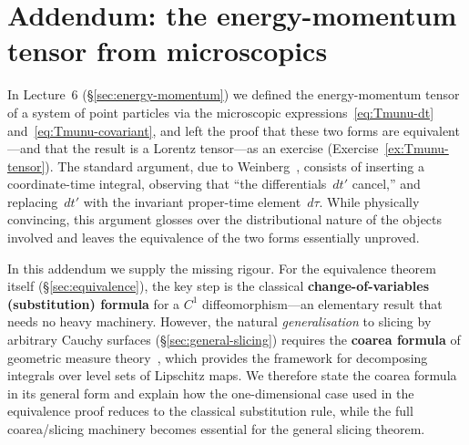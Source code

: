 %
%


\section{Addendum: the energy-momentum tensor from microscopics}%
\label{sec:emt-rigorous}

In Lecture~6 (\S\ref{sec:energy-momentum}) we defined the
energy-momentum tensor of a system of point particles via the
microscopic expressions~\eqref{eq:Tmunu-dt}
and~\eqref{eq:Tmunu-covariant}, and left the proof that these two
forms are equivalent---and that the result is a Lorentz tensor---as
an exercise (Exercise~\ref{ex:Tmunu-tensor}).  The standard argument,
due to Weinberg~\cite{Weinberg72}, consists of inserting a
coordinate-time integral, observing that ``the differentials~$dt'$
cancel,'' and replacing~$dt'$ with the invariant proper-time
element~$d\tau$.  While physically convincing, this argument glosses
over the distributional nature of the objects involved and leaves the
equivalence of the two forms essentially unproved.

In this addendum we supply the missing rigour.  For the equivalence
theorem itself (\S\ref{sec:equivalence}), the key step is the
classical \textbf{change-of-variables (substitution) formula} for a
$C^1$ diffeomorphism---an elementary result that needs no heavy
machinery.  However, the natural \emph{generalisation} to slicing by
arbitrary Cauchy surfaces (\S\ref{sec:general-slicing}) requires the
\textbf{coarea formula} of geometric measure
theory~\cite{Federer69}, which provides the framework for
decomposing integrals over level sets of Lipschitz maps.
We therefore state the coarea formula in its general form and explain
how the one-dimensional case used in the equivalence proof reduces to
the classical substitution rule, while the full coarea/slicing
machinery becomes essential for the general slicing theorem.

